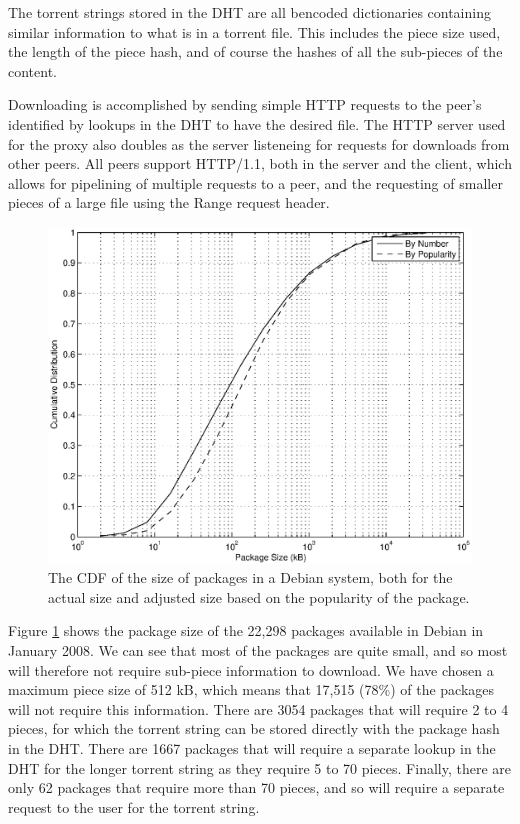 \documentclass[conference]{IEEEtran}
\begin{document}
The torrent strings stored in the DHT are all bencoded dictionaries
containing similar information to what is in a torrent file. This
includes the piece size used, the length of the piece hash, and of
course the hashes of all the sub-pieces of the content.

Downloading is accomplished by sending simple HTTP requests to the
peer's identified by lookups in the DHT to have the desired file.
The HTTP server used for the proxy also doubles as the server
listeneing for requests for downloads from other peers. All peers
support HTTP/1.1, both in the server and the client, which allows
for pipelining of multiple requests to a peer, and the requesting of
smaller pieces of a large file using the Range request header.

\begin{figure}
\centering
\includegraphics[width=\columnwidth]{apt_dht_simulation-size_CDF.eps}
\caption{The CDF of the size of packages in a Debian system, both
for the actual size and adjusted size based on the popularity of
the package.}
\label{size_CDF}
\end{figure}

Figure \ref{size_CDF} shows the package size of the 22,298 packages
available in Debian in January 2008. We can see that most of the
packages are quite small, and so most will therefore not require
sub-piece information to download. We have chosen a maximum piece
size of 512 kB, which means that 17,515 (78\%) of the packages will
not require this information. There are 3054 packages that will
require 2 to 4 pieces, for which the torrent string can be stored
directly with the package hash in the DHT. There are 1667 packages
that will require a separate lookup in the DHT for the longer
torrent string as they require 5 to 70 pieces. Finally, there are
only 62 packages that require more than 70 pieces, and so will
require a separate request to the user for the torrent string.
\end{document}
